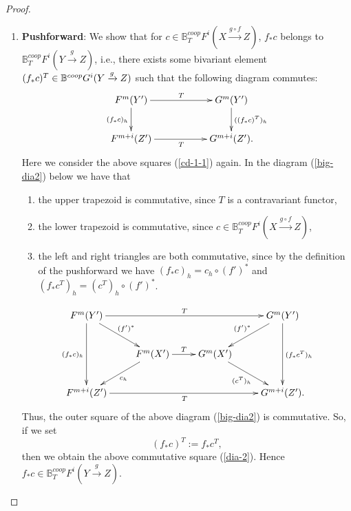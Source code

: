 \documentclass[a4paper]{amsart}
\begin{document}
\begin{proof}
\begin{enumerate}
\begin{equation}
{}
\end{equation}
Thus, the outer square of the above diagram (\ref{big-dia}) is commutative. So, if we set 
\begin{equation*}
(c \bullet d)^T := c^T \bullet d^T,
\end{equation*}
then we obtain the above commutative square (\ref{dia-1}). Hence $c \bullet d \in \mathbb B^{coop}_TF^{i+j}(X \xrightarrow {g \circ f} Z)$.
\item {\bf Pushforward}: We show that for $c \in \mathbb B^{coop}_TF^i(X \xrightarrow {g \circ f} Z)$, $f_*c$ belongs to $\mathbb B^{coop}_TF^i(Y \xrightarrow {g} Z)$, i.e., there exists some bivariant element $(f_*c)^T  \in \mathbb B^{coop}G^i(Y \xrightarrow g Z)$ such that the following diagram commutes:
\begin{equation}\label{dia-2}
\xymatrix
{
F^m(Y') \ar[d]_{(f_*c)_h} \ar[rr]^T &&  G^m(Y') \ar[d]^{((f_*c)^T)_h}\\
F^{m+i}(Z')  \ar[rr]_T &&  G^{m+i}(Z'). 
}
\end{equation}
Here we consider the above squares (\ref{cd-1-1}) again.
In the diagram (\ref{big-dia2}) below we have that
\begin{enumerate}
\item the upper trapezoid is commutative, since $T$ is a contravariant functor,
\item the lower trapezoid is commutative, since $c \in \mathbb B^{coop}_TF^i(X \xrightarrow {g \circ f} Z)$,
\item the left and right triangles are both commutative, since by the definition of the pushforward we have $(f_*c)_h = c_h \circ (f')^*$ and $(f_*c^T)_h = (c^T)_h \circ (f')^*$. 
\end{enumerate}
\begin{equation}\label{big-dia2}
\xymatrix
{
F^m(Y') \ar[dd]_{(f_*c)_h} \ar[dr]^{(f')^*} \ar[rrr]^T &&& G^m(Y')  \ar[dl]_{(f')^*} \ar[dd]^{(f_*c^T)_h} \\
& F^m(X') \ar[dl]^{c_h} \ar[r]^T & G^m(X') \ar[dr]_{(c^T)_h}  \\
F^{m+i}(Z')  \ar[rrr]_T &&& G^{m+i}(Z').
}
\end{equation}
Thus, the outer square of the above diagram (\ref{big-dia2}) is commutative. So, if we set 
\begin{equation*}
(f_*c)^T := f_*c^T,
\end{equation*}
then we obtain the above commutative square (\ref{dia-2}). Hence $f_*c \in \mathbb B^{coop}_TF^i(Y \xrightarrow {g} Z)$.

\end{enumerate}
\end{proof}
\end{document}

